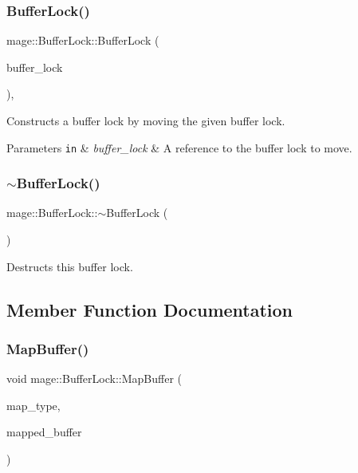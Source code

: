 \subsubsection{\texorpdfstring{Buffer\+Lock()}{BufferLock()}\hspace{0.1cm}{\footnotesize\ttfamily [4/4]}}
{\footnotesize\ttfamily mage\+::\+Buffer\+Lock\+::\+Buffer\+Lock (\begin{DoxyParamCaption}\item[{\hyperlink{classmage_1_1_buffer_lock}{Buffer\+Lock} \&\&}]{buffer\+\_\+lock }\end{DoxyParamCaption})\hspace{0.3cm}{\ttfamily [default]}, {\ttfamily [noexcept]}}

Constructs a buffer lock by moving the given buffer lock.


\begin{DoxyParams}[1]{Parameters}
\mbox{\tt in}  & {\em buffer\+\_\+lock} & A reference to the buffer lock to move. \\
\hline
\end{DoxyParams}
\hypertarget{classmage_1_1_buffer_lock_ae19ca641f652d9009738c2689a4427d9}{}\label{classmage_1_1_buffer_lock_ae19ca641f652d9009738c2689a4427d9} 
\subsubsection{\texorpdfstring{$\sim$\+Buffer\+Lock()}{~BufferLock()}}
{\footnotesize\ttfamily mage\+::\+Buffer\+Lock\+::$\sim$\+Buffer\+Lock (\begin{DoxyParamCaption}{ }\end{DoxyParamCaption})}

Destructs this buffer lock. 

\subsection{Member Function Documentation}
\hypertarget{classmage_1_1_buffer_lock_adcc9d3190b179efb5045f33551e177f7}{}\label{classmage_1_1_buffer_lock_adcc9d3190b179efb5045f33551e177f7} 
\subsubsection{\texorpdfstring{Map\+Buffer()}{MapBuffer()}}
{\footnotesize\ttfamily void mage\+::\+Buffer\+Lock\+::\+Map\+Buffer (\begin{DoxyParamCaption}\item[{D3\+D11\+\_\+\+M\+AP}]{map\+\_\+type,  }\item[{D3\+D11\+\_\+\+M\+A\+P\+P\+E\+D\+\_\+\+S\+U\+B\+R\+E\+S\+O\+U\+R\+CE $\ast$}]{mapped\+\_\+buffer }\end{DoxyParamCaption})\hspace{0.3cm}{\ttfamily [private]}}

